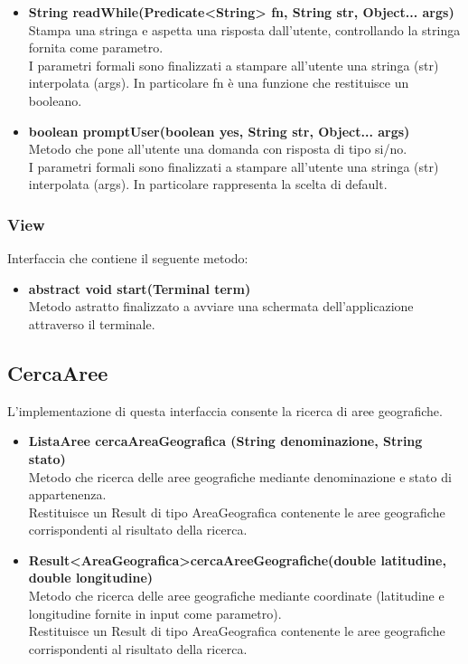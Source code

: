 \documentclass[a4paper, 12pt]{scrreprt}
\begin{document}
\begin{itemize}
					\item \textbf{String readWhile(Predicate<String> fn, String str, Object... args)}
					\\Stampa una stringa e aspetta una risposta dall'utente, controllando la stringa fornita come parametro.
					\\I parametri formali sono finalizzati a stampare all'utente una stringa (str) interpolata (args). In particolare fn \`e una funzione che restituisce un booleano.
	
					\item \textbf{boolean promptUser(boolean yes, String str, Object... args)}
					\\Metodo che pone all'utente una domanda con risposta di tipo si/no.
					\\I parametri formali sono finalizzati a stampare all'utente una stringa (str) interpolata (args). In particolare rappresenta la scelta di default.
				\end{itemize}

				\subsubsection{View}
				Interfaccia che contiene il seguente metodo:
				\begin{itemize}
				\item \textbf{abstract void start(Terminal term)}
				\\Metodo astratto finalizzato a avviare una schermata dell'applicazione attraverso il terminale.
				\end{itemize}

			\subsection{CercaAree}
			L'implementazione di questa interfaccia consente la ricerca di aree geografiche.
			\begin{itemize}
				\item \textbf{ListaAree cercaAreaGeografica (String denominazione, String stato)}
				\\Metodo che ricerca delle aree geografiche mediante denominazione e stato di appartenenza.
				\\Restituisce un Result di tipo AreaGeografica contenente le aree geografiche corrispondenti al risultato della ricerca.
				
				\item\textbf{Result\textless AreaGeografica\textgreater cercaAreeGeografiche(double latitudine, double longitudine)}
				\\Metodo che ricerca delle aree geografiche mediante coordinate (latitudine e longitudine fornite in input come parametro).
				\\Restituisce un Result di tipo AreaGeografica contenente le aree geografiche corrispondenti al risultato della ricerca.
			\end{itemize}
\end{document}
